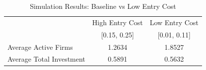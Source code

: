 \begin{table}[h]
\centering
\begin{tabular}{lcc}
\hline
 & High Entry Cost & Low Entry Cost \\
 & [0.15, 0.25] & [0.01, 0.11] \\
\hline
Average Active Firms & 1.2634 & 1.8527 \\
Average Total Investment & 0.5891 & 0.5632 \\
\hline
\end{tabular}
\caption{Simulation Results: Baseline vs Low Entry Cost}
\label{tab:results}
\end{table}
